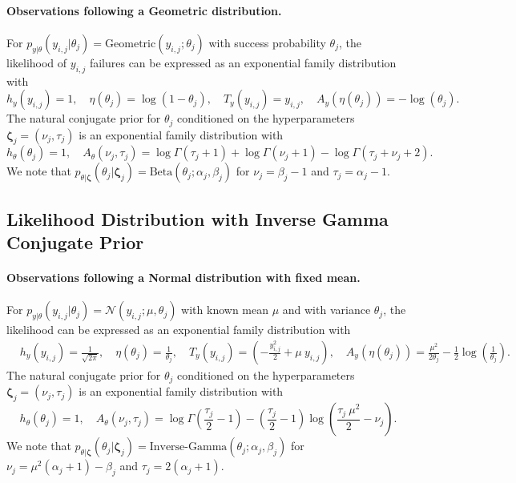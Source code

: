 \paragraph{Observations following a Geometric distribution.} 
For $p_{{y}\vert{\theta}}({y}_{i,j} \vert {\theta}_j) = \text{Geometric}({y}_{i,j};{\theta}_j)$ with success probability $\theta_j$, the likelihood of ${y}_{i,j}$ failures can be expressed as an exponential family distribution with
\begin{equation*}
h_y({y}_{i,j}) = 1  ,\quad \eta(\theta_j) = \log (1-\theta_j) ,\quad T_y({y}_{i,j}) = {y}_{i,j},\quad {A}_{{y}}({\eta}({\theta}_j)) =  -  \log(\theta_j).
\end{equation*}
The natural conjugate prior for ${\theta}_j$ conditioned on the hyperparameters $\boldsymbol{\zeta}_j = (\nu_j, \tau_j)$ is an exponential family distribution with
\begin{equation*} 
h_{{\theta}}({\theta}_j) = 1, \quad A_{\theta}({\nu}_j, {\tau}_j) = \log \Gamma(\tau_j  + 1) + \log \Gamma(\nu_j  + 1) - \log \Gamma(\tau_j  + \nu_j + 2) .
\end{equation*}
We note that $p_{\theta\vert \boldsymbol{\zeta}}(\theta_j\vert \boldsymbol{\zeta}_j)= \text{Beta}(\theta_j;\alpha_j,\beta_j)$ for $\nu_j=\beta_j-1$ and $\tau_j= \alpha_j -1$.


%
%


\subsection{Likelihood Distribution with Inverse Gamma Conjugate Prior}
\paragraph{Observations following a Normal distribution with fixed mean.} 
For $p_{{y}\vert{\theta}}({y}_{i,j} \vert {\theta}_j) = \mathcal{N}({y}_{i,j};\mu, {\theta}_j)$ with known mean $\mu$ and with variance ${\theta}_j$, the likelihood can be expressed as an exponential family distribution with
\begin{align*}
&h_{{y}}({y}_{i,j}) =  \frac{1}{\sqrt{2\pi}},\quad
{\eta}({\theta}_j) = \frac{1}{\theta_j},\quad {T}_{{y}}({y}_{i,j}) = \left(-\frac{y_{i,j}^2}{2} + \mu \: y_{i,j}\right), \quad
{A}_{{y}}({\eta}({\theta}_j)) = \frac{\mu^2}{2\theta_j} - \frac{1}{2}\log\left(\frac{1}{\theta_j}\right).
\end{align*}
The natural conjugate prior for ${\theta}_j$ conditioned on the hyperparameters $\boldsymbol{\zeta}_j = (\nu_j, \tau_j)$ is an exponential family distribution with
\begin{equation}
\label{eq:conjugate_prior_normal_fixed_mean}
h_{{\theta}}({\theta}_j) = 1, \quad A_{\theta}({\nu}_j, {\tau}_j) = \log \Gamma\left(\frac{\tau_j}{2} - 1\right) - \left(\frac{\tau_j}{2} - 1\right)\log\left(\frac{\tau_j\:\mu^2}{2} - \nu_j\right).
\end{equation}
We note that $p_{\theta\vert \boldsymbol{\zeta}}(\theta_j\vert \boldsymbol{\zeta}_j)= \text{Inverse-Gamma}(\theta_j;\alpha_j,\beta_j)$ for $\nu_j=\mu^2(\alpha_j+1) - \beta_j$ and $\tau_j=2(\alpha_j+1)$.


